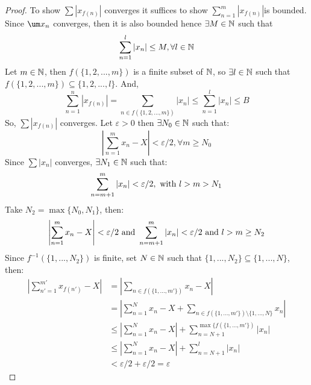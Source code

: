 \begin{proof}
    To show $\sum |x_{f(n)}|$ converges it suffices to show $\sum_{n=1}^m |x_{f(n)}|$is bounded. Since $\um x_n$ converges, then it is also bounded hence $\exists M \in \mathbb{N}$ such that
    \begin{equation*}
        \sum \limits_{n=1}^l |x_n| \leq M, \forall l \in \mathbb{N}
    \end{equation*}
    Let $m \in \mathbb{N}$, then $f(\{1, 2, ..., m\})$ is a finite subset of $\mathbb{N}$, so $\exists l \in \mathbb{N}$ such that $f(\{1, 2, ..., m\}) \subseteq \{1, 2, ..., l\}$. And,
    \begin{equation*}
        \sum \limits_{n=1}^n |x_{f(n)}| = \sum \limits_{n \in f(\{1, 2, ..., m\})} |x_n| \leq \sum \limits_{n=1}^l |x_n| \leq B
    \end{equation*}
    So, $\sum |x_{f(n)}|$ converges. Let $\varepsilon  > 0$ then $\exists N_0 \in \mathbb{N}$ such that:
    \begin{equation*}
        \left |
            \sum \limits_{n=1}^m x_n - X
        \right | < \varepsilon/2, \forall m \geq N_0
    \end{equation*}
    Since $\sum |x_n|$ converges, $\exists N_1 \in \mathbb{N}$ such that:
    \begin{equation*}
        \sum \limits_{n=m+1}^m |x_n| < \varepsilon/2, \textnormal{ with } l > m > N_1
    \end{equation*}
    Take $N_2 = \max\{N_0, N_1\}$, then:
    \begin{equation*}
        \left |
            \sum \limits_{n=1}^m x_n - X
        \right | < \varepsilon/2
        \textnormal{ and }
        \sum \limits_{n=m+1}^m |x_n| < \varepsilon/2
        \textnormal{ and }
        l > m \geq N_2
    \end{equation*}
    Since $f^{-1}(\{1, ..., N_2\})$ is finite, set $N \in \mathbb{N}$ such that $\{1, ..., N_2\} \subseteq \{1, ..., N\}$, then:
    \begin{align*}
        \left |
            \sum \limits_{n'=1}^{m'} x_{f(n')} - X
        \right | &= 
        \left |
            \sum \limits_{n \in f(\{ 1, ..., m'\})} x_n - X
        \right | \\
        &= \left |
            \sum \limits_{n=1}^N x_n - X
            + \sum \limits_{n \in f(\{1, ..., m'\}) \setminus \{1, ..., N\}} x_n
        \right | \\
        &\leq
        \left |
            \sum \limits_{n=1}^N x_n - X
        \right | + \sum \limits_{n=N+1}^{\max \{f(\{1, ..., m'\})} |x_n|  \\
        &\leq 
        \left |
            \sum \limits_{n=1}^N x_n - X
        \right | + \sum \limits_{n=N+1}^{l} |x_n|  \\
        &< \varepsilon/2 + \varepsilon/2 = \varepsilon
    \end{align*} 
\end{proof}